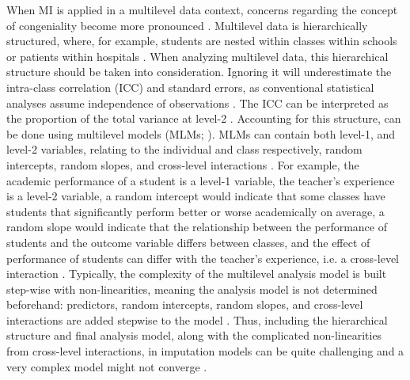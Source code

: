\documentclass[10pt, a4paper, titlepage]{article}
\begin{document}
When MI is applied in a multilevel data context, concerns regarding the concept of congeniality become more pronounced \citep{mistlerComparisonJointModel2017, enders2018, enders2018a, enders2020, buurenFlexibleImputationMissing2018, taljaard2008, enders2016, resche-rigon2018, audigier2018, dong2023, grund2016, grund2018a, grund2018, ludtke2017, grund2021, quartagno2022}. Multilevel data is hierarchically structured, where, for example, students are nested within classes within schools or patients within hospitals \citep{hox2017, hox2011}. When analyzing multilevel data, this hierarchical structure should be taken into consideration. Ignoring it will underestimate the intra-class correlation (ICC) and standard errors, as conventional statistical analyses assume independence of observations \citep{buurenFlexibleImputationMissing2018, ludtke2017, taljaard2008, hox2011}. The ICC can be interpreted as the proportion of the total variance at level-2 \citep{gulliford2005, shieh2012, hox2011}. Accounting for this structure, can be done using multilevel models (MLMs; ). MLMs can contain both level-1, and level-2 variables, relating to the individual and class respectively, random intercepts, random slopes, and cross-level interactions \citep{hox2017, hox2011}. For example, the academic performance of a student is a level-1 variable, the teacher's experience is a level-2 variable, a random intercept would indicate that some classes have students that significantly perform better or worse academically on average, a random slope would indicate that the relationship between the performance of students and the outcome variable differs between classes, and the effect of performance of students can differ with the teacher's experience, i.e. a cross-level interaction \citep{hox2017, hox2011}. Typically, the complexity of the multilevel analysis model is built step-wise with non-linearities, meaning the analysis model is not determined beforehand: predictors, random intercepts, random slopes, and cross-level interactions are added stepwise to the model \citep{hox2017, hox2011}. Thus, including the hierarchical structure and final analysis model, along with the complicated non-linearities from cross-level interactions, in imputation models can be quite challenging \citep{buurenFlexibleImputationMissing2018, burgette2010, hox2011} and a very complex model might not converge \citep{buurenFlexibleImputationMissing2018}.
\end{document}

